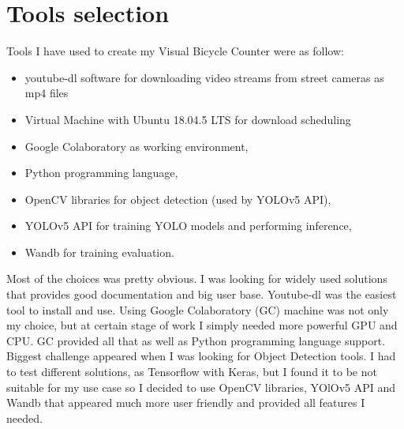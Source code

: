 \section{Tools selection}
\label{sec:tools}

Tools I have used to create my Visual Bicycle Counter were as follow:
\begin{itemize}
    \item youtube-dl software for downloading video streams from street cameras as mp4 files
    \item Virtual Machine with Ubuntu 18.04.5 LTS for download scheduling 
    \item Google Colaboratory as working environment,
    \item Python programming language,
    \item OpenCV libraries for object detection (used by YOLOv5 API),
    \item YOLOv5 API for training YOLO\cite{Redmon_2016_CVPR} models and performing inference,
    \item Wandb for training evaluation.
\end{itemize}
Most of the choices was pretty obvious. I was looking for widely used solutions that provides good documentation and big user base. Youtube-dl was the easiest tool to install and use. Using Google Colaboratory (GC) machine was not only my choice, but at certain stage of work I simply needed more powerful GPU and CPU. GC provided all that as well as Python programming language support. Biggest challenge appeared when I was looking for Object Detection tools. I had to test different solutions, as Tensorflow with Keras, but I found it to be not suitable for my use case so I decided to use OpenCV libraries, YOlOv5 API and Wandb that appeared much more user friendly and provided all features I needed.
